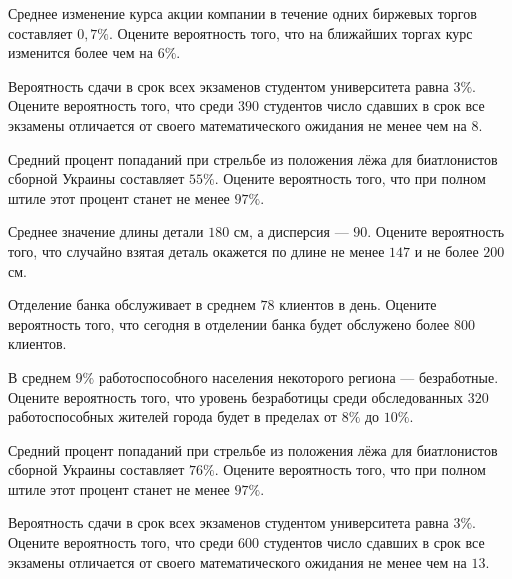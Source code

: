 \vfill

\newpage\setcounter{zad}{0}

\z Среднее изменение курса акции компании в течение одних биржевых торгов составляет $ 0{,}7 \% $. Оцените вероятность того, что на ближайших торгах курс изменится более чем на $ 6 \% $.


\vfill

\z Вероятность сдачи в срок всех экзаменов студентом университета равна $ 3 \% $. Оцените вероятность того, что среди $ 390 $ студентов число сдавших в срок все экзамены отличается от своего математического ожидания не менее чем на $ 8 $. 
 

\vfill

\newpage\setcounter{zad}{0}

\z Средний процент попаданий при стрельбе из положения лёжа для биатлонистов сборной Украины составляет $ 55 \% $. Оцените вероятность того, что при полном штиле этот процент станет не менее $ 97 \% $.


\vfill

\z Среднее значение длины детали $ 180 $ см, а дисперсия --- $ 90 $. Оцените вероятность того, что случайно взятая деталь окажется по длине не менее $ 147 $ и не более $ 200 $ см.
 

\vfill

\newpage\setcounter{zad}{0}

\z Отделение банка обслуживает в среднем $ 78 $ клиентов в день. Оцените вероятность того, что сегодня в отделении банка будет обслужено более $ 800 $ клиентов.


\vfill

\z В среднем $ 9 \% $ работоспособного населения некоторого региона --- безработные. Оцените вероятность того, что уровень безработицы среди обследованных $ 320 $ работоспособных жителей города будет в пределах от $ 8 \%$ до $ 10 \%$.
 

\vfill

\newpage\setcounter{zad}{0}

\z Средний процент попаданий при стрельбе из положения лёжа для биатлонистов сборной Украины составляет $ 76 \% $. Оцените вероятность того, что при полном штиле этот процент станет не менее $ 97 \% $.


\vfill

\z Вероятность сдачи в срок всех экзаменов студентом университета равна $ 3 \% $. Оцените вероятность того, что среди $ 600 $ студентов число сдавших в срок все экзамены отличается от своего математического ожидания не менее чем на $ 13 $. 
 

